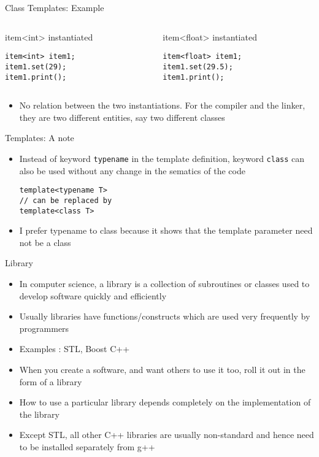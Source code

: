 \documentclass{beamer}
\begin{document}
\begin{frame}[fragile]{Class Templates: Example}
  \begin{columns}
    \begin{column}{0.4\textwidth}
item<int> instantiated
      \begin{lstlisting}
item<int> item1;
item1.set(29);
item1.print();
      \end{lstlisting}\pause
    \end{column}
    \begin{column}{0.4\textwidth}
item<float> instantiated
      \begin{lstlisting}
item<float> item1;
item1.set(29.5);
item1.print();
      \end{lstlisting}\pause
    \end{column}
  \end{columns}
  \begin{itemize}
  \item No relation between the two instantiations. For the compiler and the linker, they are two different entities, say two different classes
  \end{itemize}
\end{frame}

\begin{frame}[fragile]{Templates: A note}
  \begin{itemize}
  \item Instead of keyword \texttt{typename} in the template definition, keyword \texttt{class} can also be used without any change in the sematics of the code\pause
    \begin{lstlisting}
template<typename T> 
// can be replaced by 
template<class T>
    \end{lstlisting}\pause
  \item I prefer typename to class because it shows that the template parameter need not be a class
  \end{itemize}
\end{frame}

\begin{frame}[fragile]{Library}
  \begin{itemize}
    \item In computer science, a library is a collection of subroutines or classes used to develop software quickly and efficiently\pause
    \item Usually libraries have functions/constructs which are used very frequently by programmers\pause
    \item Examples : STL, Boost C++\pause
    \item When you create a software, and want others to use it too, roll it out in the form of a library\pause
    \item How to use a particular library depends completely on the implementation of the library\pause
    \item Except STL, all other C++ libraries are usually non-standard and hence need to be installed separately from g++
  \end{itemize}
\end{frame}
\end{document}

